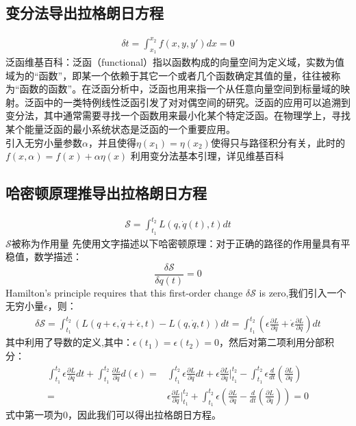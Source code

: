 \documentclass[UTF8,10pt]{article}
\begin{document}
\subsection{变分法导出拉格朗日方程}
\begin{align*}
    \delta t= \int _{x_1}^{x_2} f(x,y,y') dx =0
\end{align*}
泛函维基百科：泛函（functional）指以函数构成的向量空间为定义域，实数为值域为的“函数”，即某一个依赖于其它一个或者几个函数确定其值的量，往往被称为“函数的函数”。在泛函分析中，泛函也用来指一个从任意向量空间到标量域的映射。泛函中的一类特例线性泛函引发了对对偶空间的研究。泛函的应用可以追溯到变分法，其中通常需要寻找一个函数用来最小化某个特定泛函。在物理学上，寻找某个能量泛函的最小系统状态是泛函的一个重要应用。
\\引入无穷小量参数$\alpha$，并且使得$\eta(x_1)=\eta(x_2)$使得只与路径积分有关，此时的$f(x,\alpha)=f(x)+\alpha\eta(x)$
利用变分法基本引理，详见维基百科
\subsection{哈密顿原理推导出拉格朗日方程}
\begin{align*}
    \mathcal{S}=\int _{t_1}^{t_2} L(q,\dot{q}(t),t) dt
\end{align*}
$\mathcal{S}$被称为作用量
先使用文字描述以下哈密顿原理：对于正确的路径的作用量具有平稳值，数学描述：
\[\frac{\delta \mathcal{S}}{\delta q(t)}=0\]
Hamilton's principle requires that this first-order change $\displaystyle \delta \mathcal {S}$ is zero,我们引入一个无穷小量$\epsilon$，则：
\begin{align*}
    \delta \mathcal{S}=\int_{t_1}^{t_2} (L(q+\epsilon,\dot{q}+\dot{\epsilon},t)-L(q,\dot{q},t))dt=\int_{t_1}^{t_2}(\epsilon \frac{\partial L}{\partial \dot{q}}+\dot{\epsilon}\frac{\partial L}{\partial q})dt
\end{align*}
其中利用了导数的定义,其中：$\epsilon(t_1)=\epsilon(t_2)=0$，然后对第二项利用分部积分：
\begin{align*}
    \int_{t_1}^{t_2}{\epsilon \frac{\partial L}{\partial q}}dt+\int_{t_1}^{t_2}{\frac{\partial L}{\partial \dot{q}}}d\left( \epsilon \right)
    = & \int_{t_1}^{t_2}{\epsilon \frac{\partial L}{\partial q}}dt+\epsilon\frac{\partial L}{\partial \dot{q}}|_{t_1}^{t_2}
    -\int_{t_1}^{t_2}\epsilon \frac{d}{dt}(\frac{\partial L}{\partial \dot{q}})                                                                                                  \\
    = & \epsilon\frac{\partial L}{\partial \dot{q}}\vert_{t_1}^{t_2}+\int_{t_1}^{t_2}\epsilon(\frac{\partial L}{\partial q}-\frac{d}{dt}(\frac{\partial L}{\partial \dot{q}}))=0
\end{align*}
式中第一项为0，因此我们可以得出拉格朗日方程。
\end{document}
